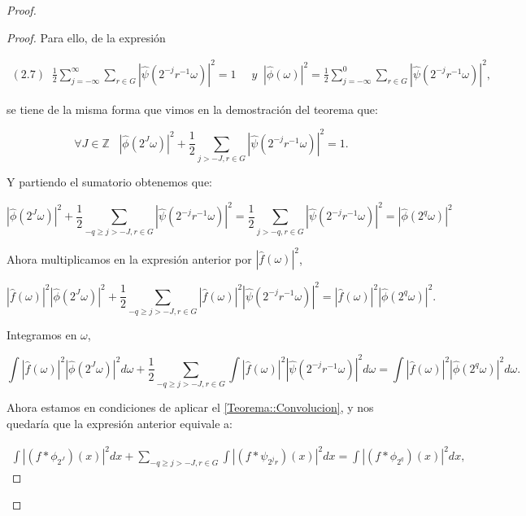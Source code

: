\begin{proof}
\begin{proof}
  \noindent Para ello, de la expresión

  \begin{align*}
    (2.7) \; \; \frac{1}{2} \sum_{j=-\infty}^\infty \sum_{r \in G} |\widehat{\psi}(2^{-j}r^{-1}\omega)|^2=1 & \; \; y
    \;\;|\widehat{\phi}(\omega)|^2= \frac{1}{2} \sum_{j=-\infty}^0 \sum_{r\in G} |\widehat{\psi}(2^{-j}r^{-1}\omega)|^2,
  \end{align*}

  \noindent se tiene de la misma forma que vimos en la demostración del teorema que:

  $$\forall J \in \mathbb{Z} \; \; \; \left|\widehat{\phi}\left(2^J\omega\right)\right|^2 + \frac{1}{2} \sum_{j>-J,r\in G}\left|\widehat{\psi}\left(2^{-j}r^{-1}\omega\right)\right|^2=1. $$

  \noindent Y partiendo el sumatorio obtenemos que: 

  $$\left|\widehat{\phi}\left(2^J\omega\right)\right|^2 + \frac{1}{2}  \sum_{-q \geq j >-J,r \in G}\left|\widehat{\psi}\left(2^{-j}r^{-1}\omega\right)\right|^2= \frac{1}{2} \sum_{j>-q,r \in G}\left|\widehat{\psi}\left(2^{-j}r^{-1}\omega\right)\right|^2=|\widehat{\phi}(2^q \omega)|^2$$
  
  \noindent Ahora multiplicamos en la expresión anterior por $|\widehat{f}(\omega)|^2$, 
  
  $$\left|\widehat{f}(\omega)\right|^2 \left|\widehat{\phi}\left(2^J\omega\right)\right|^2 + \frac{1}{2} \sum_{-q \geq j >-J,r \in G} \left|\widehat{f}(\omega)\right|^2 \left|\widehat{\psi}\left(2^{-j}r^{-1}\omega\right)\right|^2=\left|\widehat{f}(\omega)\right|^2 \left|\widehat{\phi}(2^q \omega)\right|^2.$$

  \noindent Integramos en $\omega$, 

  $$\int \left|\widehat{f}(\omega)\right|^2 \left|\widehat{\phi}\left(2^J\omega\right)\right|^2 d\omega + \frac{1}{2} \sum_{-q \geq j >-J,r \in G} \int \left|\widehat{f}(\omega)\right|^2 \left|\widehat{\psi}\left(2^{-j}r^{-1}\omega\right)\right|^2 d\omega=\int \left|\widehat{f}(\omega)\right|^2 \left|\widehat{\phi}(2^q \omega)\right|^2 d\omega.$$

  \noindent Ahora estamos en condiciones de aplicar el \autoref{Teorema::Convolucion}, y nos quedaría que la expresión anterior equivale a: 

  \begin{align*}
    \int \left|(f \ast \phi_{2^J}) (x)\right|^2 dx + \sum_{-q \geq j >-J,r \in G} \int \left|(f \ast \psi_{2^{j}r})(x)\right|^2 dx=\int \left|(f \ast \phi_{2^q}) (x)\right|^2 dx,
  \end{align*}


\end{proof}
\end{proof}
